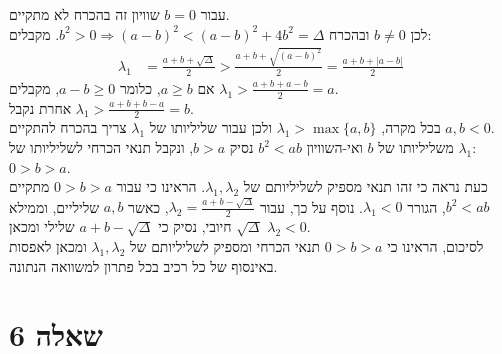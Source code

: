 \documentclass{article}
\begin{document}
עבור $b=0$ שוויון זה בהכרח לא מתקיים.\\
לכן $b\ne0$ ובהכרח $b^2>0\Rightarrow (a-b)^2<(a-b)^2+4b^2=\Delta$.
מקבלים:
\begin{align*}
    \lambda_1 & =\frac{a+b+\sqrt{\Delta}}{2}>\frac{a+b+\sqrt{(a-b)^2}}{2}=\frac{a+b+|a-b|}{2}
\end{align*}
אם $a\geq b$, כלומר $a-b\geq 0$, מקבלים $\lambda_1>\frac{a+b+a-b}{2}=a$. \\
אחרת נקבל $\lambda_1>\frac{a+b+b-a}{2}=b$. \\
בכל מקרה, $\lambda_1>\max\{a,b\}$ ולכן עבור שליליותו של $\lambda_1$ צריך בהכרח להתקיים $a,b<0$. \\
משליליותו של $b$ ואי-השוויון $b^2<ab$ נסיק $b>a$, ונקבל תנאי הכרחי לשליליותו של $\lambda_1$: $0>b>a$.\\
כעת נראה כי זהו תנאי מספיק לשליליותם של $\lambda_1,\lambda_2$. הראינו כי עבור $0>b>a$ מתקיים $b^2<ab$, הגורר $\lambda_1<0$.
נוסף על כך, עבור $\lambda_2=\frac{a+b-\sqrt{\Delta}}{2}$, כאשר $a,b$ שליליים, וממילא $\sqrt{\Delta}$ חיובי, נסיק כי $a+b-\sqrt{\Delta}$ שלילי ומכאן $\lambda_2<0$.\\
לסיכום, הראינו כי $0>b>a$ תנאי הכרחי ומספיק לשליליותם של $\lambda_1,\lambda_2$ ומכאן לאפסות באינסוף של כל רכיב בכל פתרון למשוואה הנתונה.

\pagebreak

\section*{שאלה 6}
\end{document}
